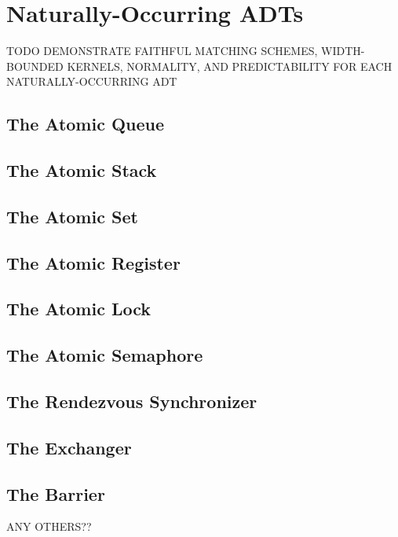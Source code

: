 \section{Naturally-Occurring ADTs}
\label{sec:nature}

TODO DEMONSTRATE FAITHFUL MATCHING SCHEMES, WIDTH-BOUNDED KERNELS, NORMALITY,
AND PREDICTABILITY FOR EACH NATURALLY-OCCURRING ADT

\subsection{The Atomic Queue}

\subsection{The Atomic Stack}

\subsection{The Atomic Set}

\subsection{The Atomic Register}

\subsection{The Atomic Lock}

\subsection{The Atomic Semaphore}

\subsection{The Rendezvous Synchronizer}

\subsection{The Exchanger}

\subsection{The Barrier}

ANY OTHERS??
